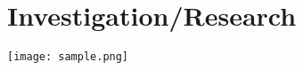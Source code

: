 \section*{Investigation/Research}
\lipsum[2]

\begin{center}
\texttt{[image: sample.png]}
\end{center}
